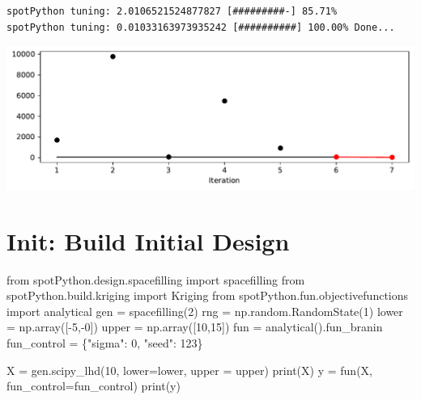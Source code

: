 \documentclass[
  letterpaper,
  DIV=11,
  numbers=noendperiod]{scrreprt}
\newenvironment{Shaded}{\begin{snugshade}}{\end{snugshade}}
\newcommand{\BuiltInTok}[1]{\textcolor[rgb]{0.00,0.23,0.31}{#1}}
\newcommand{\DecValTok}[1]{\textcolor[rgb]{0.68,0.00,0.00}{#1}}
\newcommand{\ImportTok}[1]{\textcolor[rgb]{0.00,0.46,0.62}{#1}}
\newcommand{\NormalTok}[1]{\textcolor[rgb]{0.00,0.23,0.31}{#1}}
\newcommand{\OperatorTok}[1]{\textcolor[rgb]{0.37,0.37,0.37}{#1}}
\newcommand{\StringTok}[1]{\textcolor[rgb]{0.13,0.47,0.30}{#1}}
\begin{document}
\begin{verbatim}
spotPython tuning: 2.0106521524877827 [#########-] 85.71% 
spotPython tuning: 0.01033163973935242 [##########] 100.00% Done...
\end{verbatim}

\includegraphics{a_04_spot_doc_files/figure-pdf/cell-13-output-2.pdf}

\section{Init: Build Initial Design}\label{init-build-initial-design-1}

\begin{Shaded}
\begin{Highlighting}[]
\ImportTok{from}\NormalTok{ spotPython.design.spacefilling }\ImportTok{import}\NormalTok{ spacefilling}
\ImportTok{from}\NormalTok{ spotPython.build.kriging }\ImportTok{import}\NormalTok{ Kriging}
\ImportTok{from}\NormalTok{ spotPython.fun.objectivefunctions }\ImportTok{import}\NormalTok{ analytical}
\NormalTok{gen }\OperatorTok{=}\NormalTok{ spacefilling(}\DecValTok{2}\NormalTok{)}
\NormalTok{rng }\OperatorTok{=}\NormalTok{ np.random.RandomState(}\DecValTok{1}\NormalTok{)}
\NormalTok{lower }\OperatorTok{=}\NormalTok{ np.array([}\OperatorTok{{-}}\DecValTok{5}\NormalTok{,}\OperatorTok{{-}}\DecValTok{0}\NormalTok{])}
\NormalTok{upper }\OperatorTok{=}\NormalTok{ np.array([}\DecValTok{10}\NormalTok{,}\DecValTok{15}\NormalTok{])}
\NormalTok{fun }\OperatorTok{=}\NormalTok{ analytical().fun\_branin}
\NormalTok{fun\_control }\OperatorTok{=}\NormalTok{ \{}\StringTok{"sigma"}\NormalTok{: }\DecValTok{0}\NormalTok{,}
               \StringTok{"seed"}\NormalTok{: }\DecValTok{123}\NormalTok{\}}

\NormalTok{X }\OperatorTok{=}\NormalTok{ gen.scipy\_lhd(}\DecValTok{10}\NormalTok{, lower}\OperatorTok{=}\NormalTok{lower, upper }\OperatorTok{=}\NormalTok{ upper)}
\BuiltInTok{print}\NormalTok{(X)}
\NormalTok{y }\OperatorTok{=}\NormalTok{ fun(X, fun\_control}\OperatorTok{=}\NormalTok{fun\_control)}
\BuiltInTok{print}\NormalTok{(y)}
\end{Highlighting}
\end{Shaded}
\end{document}
